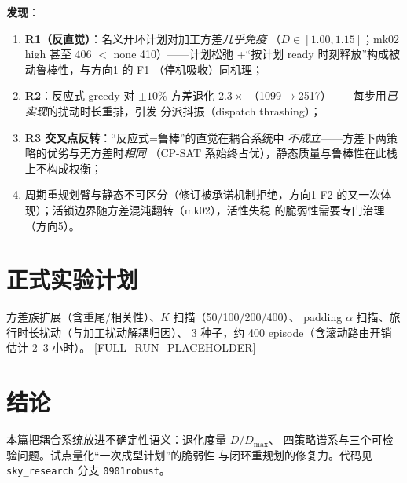 \documentclass[UTF8,12pt,a4paper]{ctexart}
\begin{document}
\textbf{发现}：
\begin{enumerate}
  \item \textbf{R1（反直觉）}：名义开环计划对加工方差\emph{几乎免疫}
    （$D\in[1.00,1.15]$；mk02 high 甚至 406 $<$ none 410）——计划松弛
    +``按计划 ready 时刻释放''构成被动鲁棒性，与方向1 的 F1
    （停机吸收）同机理；
  \item \textbf{R2}：反应式 greedy 对 $\pm10\%$ 方差退化 $2.3\times$
    （1099$\to$2517）——每步用\emph{已实现}的扰动时长重排，引发
    分派抖振（dispatch thrashing）；
  \item \textbf{R3 交叉点反转}：``反应式=鲁棒''的直觉在耦合系统中
    \emph{不成立}——方差下两策略的优劣与无方差时\emph{相同}
    （CP-SAT 系始终占优），静态质量与鲁棒性在此栈上不构成权衡；
  \item 周期重规划臂与静态不可区分（修订被承诺机制拒绝，方向1 F2
    的又一次体现）；活锁边界随方差混沌翻转（mk02），活性失稳
    的脆弱性需要专门治理（方向5）。
\end{enumerate}

\section{正式实验计划}

方差族扩展（含重尾/相关性）、$K$ 扫描（50/100/200/400）、
padding $\alpha$ 扫描、旅行时长扰动（与加工扰动解耦归因）、
3 种子，约 400 episode（含滚动路由开销估计 2--3 小时）。
[FULL\_RUN\_PLACEHOLDER]

\section{结论}

本篇把耦合系统放进不确定性语义：退化度量 $D/D_{\max}$、
四策略谱系与三个可检验问题。试点量化``一次成型计划''的脆弱性
与闭环重规划的修复力。代码见 \texttt{sky\_research} 分支
\texttt{0901robust}。



\end{document}
